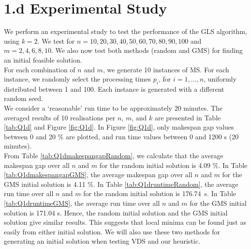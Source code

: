 \documentclass[12pt,a4paper,reqno]{article}
\begin{document}
\section*{1.d Experimental Study}
We perform an experimental study to test the performance of the GLS algorithm, using $k=2$. We test for $n=10,20,30,40,50,60,70,80,90,100$ and $m=2,4,6,8,10$. We also now test both methods (random and GMS) for finding an initial feasible solution. \\

For each combination of $n$ and $m$, we generate 10 instances of MS. For each instance, we randomly select the processing times $p_i$, for $i=1,...,n$, uniformly distributed between 1 and 100. Each instance is generated with a different random seed. \\

We consider a `reasonable' run time to be approximately 20 minutes. The averaged results of 10 realisations per $n$, $m$, and $k$ are presented in Table \ref{tab:Q1d} and Figure \ref{fig:Q1d}. In Figure \ref{fig:Q1d}, only makespan gap values between 0 and 20 \% are plotted, and run time values between 0 and 1200 s (20 minutes). \\

From Table \ref{tab:Q1dmakespangapRandom}, we calculate that the average makespan gap over all $n$ and $m$ for the random initial solution is 4.09 \%. In Table \ref{tab:Q1dmakespangapGMS}, the average makespan gap over all $n$ and $m$ for the GMS initial solution is 4.11 \%. In Table \ref{tab:Q1druntimeRandom}, the average run time over all $n$ and $m$ for the random initial solution is 176.74~s. In Table \ref{tab:Q1druntimeGMS}, the average run time over all $n$ and $m$ for the GMS initial solution is 171.04 s. Hence, the random initial solution and the GMS initial solution give similar results. This suggests that local minima can be found just as easily from either initial solution. We will also use these two methods for generating an initial solution when testing VDS and our heuristic.
\end{document}
